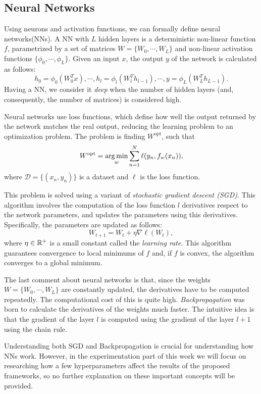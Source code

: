 \subsection{Neural Networks}

Using neurons and activation functions, we can formally define neural networks(NNs). A NN with $L$ hidden layers is a deterministic non-linear function $f$, parametrized by a set of matrices $W = \{W_0,\cdots,W_L\}$ and non-linear activation functions $\{\phi_0,\cdots,\phi_L\}$. Given an input $x$, the output $y$ of the network is calculated as follows:
\[
h_0 = \phi_0\left(W_0^Tx\right), \cdots, h_l = \phi_l\left(W_l^T h_{l-1}\right),\cdots, y = \phi_L\left(W_L^T h_{L-1}\right).
\]
Having a NN, we consider it \emph{deep} when the number of hidden layers (and, consequently, the number of matrices) is considered high. 

Neural networks use loss functions, which define how well the output returned by the network matches the real output, reducing the learning problem to an optimization problem. The problem is finding $W^{\operatorname{opt}}$, such that
\[
W^{\operatorname{opt}}   = \operatorname*{arg\,min}_{w} \sum_{n = 1}^N \ell(y_n, f_w(x_n)),
\]
where $\mathcal D = \{(x_n,y_n)\}$ is a dataset and $\ell$ is the loss function.

This problem is solved using a variant of \emph{stochastic gradient descent (SGD)}. This algorithm involves the computation of the loss function $l$ derivatives respect to the network parameters, and updates the parameters using this derivatives. Specifically, the parameters are updated as follows:
\[
W_{t+1} = W_t + \eta \nabla \ell(W_t),
\]
where $\eta \in \mathbb{R}^+$ is a small constant called the \emph{learning rate}. This algorithm guarantees convergence to local minimums of $f$ and, if $f$ is convex, the algorithm converges to a global minimum.

The last comment about neural networks is that, since the weights $W = \{W_0,\cdots,W_L\}$ are constantly updated, the derivatives have to be computed repeatedly. The computational cost of this is quite high. \emph{Backpropagation} was born to calculate the derivatives of the weights much faster. The intuitive idea is that the gradient of the layer $l$ is computed using the gradient of the layer $l+1$ using the chain rule.

Understanding both SGD and Backpropagation is crucial for understanding how NNs  work. However, in the experimentation part of this work we will focus on researching how a few hyperparameters affect the results of the proposed frameworks, so no further explanation on these important concepts will be provided.

